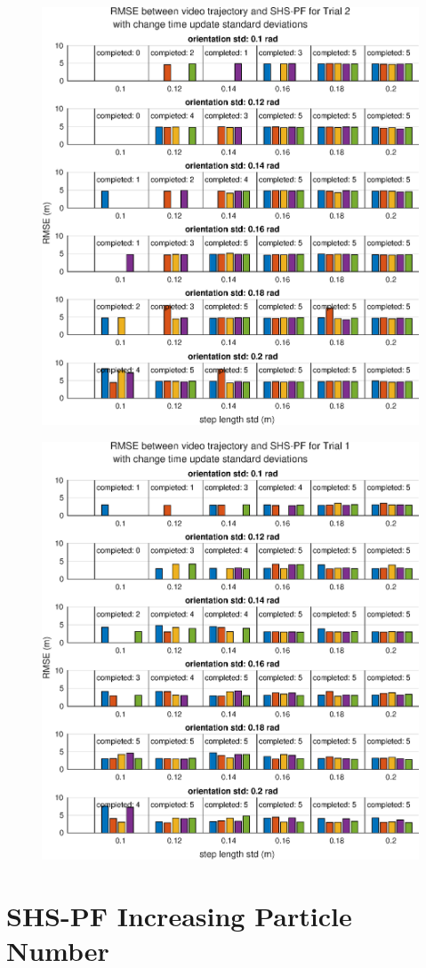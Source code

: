 \begin{figure}[H]
	\centering
	\includegraphics[width=0.6\linewidth]{images/20201201_0951_RMSE_between_video_trajectory_and_SHS-PF_for_Trial_2_1}
		\setlength{\belowcaptionskip}{-20pt}
	\caption{}
	\label{fig:202012010951rmsebetweenvideotrajectoryandshs-pffortrial21}
\end{figure}
\begin{figure}[H]
	\centering
	\includegraphics[width=0.6\linewidth]{images/20201201_0951_RMSE_between_video_trajectory_and_SHS-PF_for_Trial_1_1}
		\setlength{\belowcaptionskip}{-20pt}
	\caption{}
	\label{fig:202012010951rmsebetweenvideotrajectoryandshs-pffortrial11}
\end{figure}


\newpage
\section{SHS-PF Increasing Particle Number}
\label{app:SHS-PF trials}

